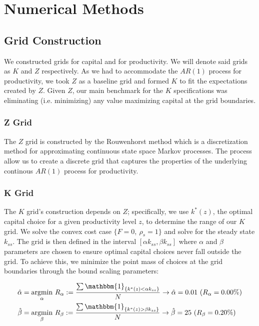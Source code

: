 \section{Numerical Methods}\label{sec:num_methods}
\subsection{Grid Construction}\label{subsec:grid_construction}

We constructed grids for capital and for productivity.
We will denote said grids as $K$ and $Z$ respectively.
As we had to accommodate the $AR(1)$ process for productivity, we took $Z$ as a baseline grid and formed $K$ to fit the expectations created by $Z$.
Given $Z$, our main benchmark for the $K$ specifications was eliminating (i.e. minimizing) any value maximizing capital at the grid boundaries.

\subsubsection{Z Grid}\label{subsubsec:z_grid}

The $Z$ grid is constructed by the Rouwenhorst method which is a discretization method for approximating continuous state space Markov processes.
The process allow us to create a discrete grid that captures the properties of the underlying continous $AR(1)$ process for productivity.

\subsubsection{K Grid}\label{subsubsec:k_grid}

The $K$ grid's construction depends on $Z$; specifically, we use $k^*(z)$, the optimal capital choice for a given productivity level $z$, to determine the range of our $K$ grid.
We solve the convex cost case $\{F=0, \ \rho_s = 1\}$ and solve for the steady state $k_{ss}$.
The grid is then defined in the interval $[\alpha k_{ss}, \beta k_{ss}]$ where $\alpha$ and $\beta$ parameters are chosen to ensure optimal capital choices never fall outside the grid.
To achieve this, we minimize the point mass of choices at the grid boundaries through the bound scaling parameters:

\begin{equation}
    \begin{aligned}
        \hat{\alpha} &= \underset{\alpha}{\operatorname{argmin}}\ R_{\alpha}:=\frac{\sum \mathbbm{1}_{\{k^*(z) < \alpha k_{ss}\}}}{N} \to \hat{\alpha} = 0.01 \ (R_{\alpha} = 0.00\%)\\
        \hat{\beta} &= \underset{\beta}{\operatorname{argmin}}\ R_{\beta}:=\frac{\sum \mathbbm{1}_{\{k^*(z) > \beta k_{ss}\}}}{N} \to \hat{\beta} = 25 \ (R_{\beta} = 0.20\%)
    \end{aligned}
\end{equation}

